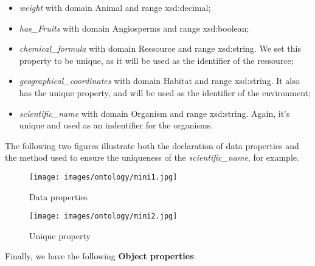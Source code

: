     \begin{itemize}
        \item \textit{weight} with domain Animal and range xsd:decimal;

        \item \textit{has\_Fruits} with domain Angiosperms and range xsd:boolean;

        \item \textit{chemical\_formula} with domain Ressource and range xsd:string. We set this property to be unique, as it will be used as the identifier of the ressource;

        \item \textit{geographical\_coordinates} with domain Habitat and range xsd:string. It also has the unique property, and will be used as the identifier of the environment;

        \item \textit{scientific\_name} with domain Organism and range xsd:string. Again, it's unique and used as an indentifier for the organisms.
        \\

    \end{itemize}


The following two figures illustrate both the declaration of data properties and the method used to ensure the uniqueness of the \textit{scientific\_name}, for example.
\\

\begin{figure}[H]
    \centering
    \begin{minipage}{0.35\textwidth}
        \centering
        \texttt{[image: images/ontology/mini1.jpg]}
        \caption{Data properties}
        \label{fig:figura1}
    \end{minipage}%
    \hspace{0.1\textwidth}
    \begin{minipage}{0.35\textwidth}
        \centering
        \texttt{[image: images/ontology/mini2.jpg]}
        \caption{Unique property}
        \label{fig:figura2}
    \end{minipage}
\end{figure}

Finally, we have the following \textbf{Object properties}:
\\

